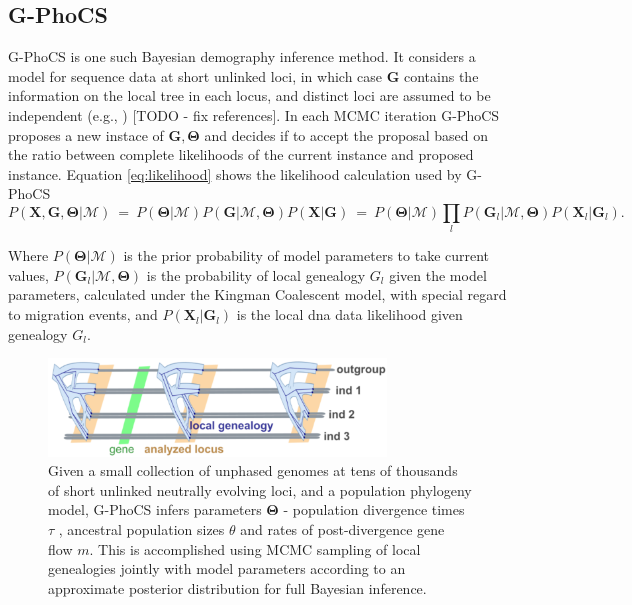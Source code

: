\documentclass[11pt]{article}
\newcommand{\vect}[1]{\boldsymbol{\mathbf{#1}}}
\newcommand{\X}{\vect{X}}
\newcommand{\M}{\mathcal{M}}
\newcommand{\G}{\vect{G}}
\newcommand{\T}{\vect{\Theta}}
\newcommand{\1}{\mathbbm{1}}
\newcommand{\gp}{G-PhoCS }
\begin{document}
\subsection{\gp}

\gp is one such Bayesian demography inference method. It considers a model for sequence data at short unlinked loci, in which case 
$\G$ contains the information on the local tree in each locus, and distinct loci are assumed to be independent (e.g., \cite{NIELWAKE01,RANNYANG03,GRONETAL11}) [TODO - fix references]. In each MCMC iteration \gp proposes a new instace of $\G, \T$ and decides if to accept the proposal based on the ratio between complete likelihoods of the current instance and proposed instance. Equation \ref{eq:likelihood} shows the likelihood calculation used by \gp
%
\begin{equation}\label{eq:likelihood}
 P(\X,\G,\T|\M) ~=~ P(\T|\M) P(\G|\M,\T) P(\X|\G) ~=~ P(\T|\M) \prod_l P(\G_l|\M,\T) P(\X_l|\G_l).
\end{equation}

Where $P(\T|\M)$ is the prior probability of model parameters to take current values, $P(\G_l|\M,\T)$ is the probability of local genealogy $G_l$ given the model parameters, calculated under the Kingman Coalescent model, with special regard to migration events, and $P(\X_l|\G_l)$ is the local dna data likelihood given genealogy $G_l$.


\begin{figure}[h]
\centering
\includegraphics[width=0.8\textwidth]
{multiple_loci_across_sequence}
\captionsetup{width=.8\textwidth}
\caption{Given a small collection
of unphased genomes at tens of thousands of short unlinked neutrally evolving loci, and a population phylogeny model, \gp infers parameters $\T$ - population divergence times $\tau$ , ancestral population sizes $\theta$ and rates of post-divergence gene flow $m$. This is accomplished using MCMC sampling of local
genealogies jointly with model parameters according to an approximate posterior distribution for full Bayesian inference.}
\label{fig:multiple_loci_across_sequence}
\end{figure}
\end{document}

